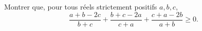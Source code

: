 Montrer que, pour tous réels strictement positifs $a, b, c$,
\[ \frac{a + b - 2c}{b + c} + \frac{b + c - 2a}{c + a} + \frac{c + a - 2b}{a + b} \geq 0. \]

